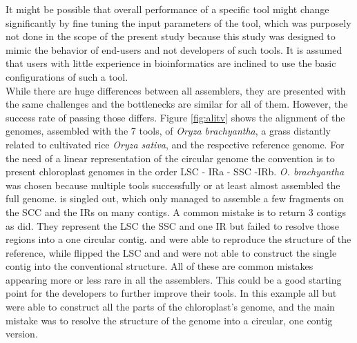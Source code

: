 It might be possible that overall performance of a specific tool might change significantly by fine tuning the
input parameters of the tool, which was purposely not done in the scope of the present study because this
study was designed to mimic the behavior of end-users and not developers of such tools. It is assumed that
users with little experience in bioinformatics are inclined to use the basic configurations of such a tool. \\

While there are huge differences between all assemblers, they are presented with the same challenges and the
bottlenecks are similar for all of them. However, the success rate of passing those differs. Figure
\ref{fig:alitv} shows the alignment of the genomes, assembled with the 7 tools, of \textit{Oryza brachyantha},
a grass distantly related to cultivated rice \textit{Oryza sativa}, and the respective reference genome. For
the need of a linear representation of the circular genome the convention is to present chloroplast genomes in
the order LSC - IRa - SSC -IRb. \textit{O. brachyantha} was chosen because multiple tools successfully or at
least almost assembled the full genome.  \cassp \hspace{.5ex} is singled out, which only managed to assemble a
few fragments on the SCC and the IRs on many contigs. A common mistake is to return 3 contigs as \ioga
\hspace{.5ex} did. They represent the LSC the SSC and one IR but failed to resolve those regions into a one
circular contig. \go \hspace{.5ex} and \fp \hspace{.5ex} were able to reproduce the structure of the
reference, while \ce \hspace{.5ex} flipped the LSC and \np \hspace{.5ex} and \oa \hspace{.5ex} were not able
to construct the single contig into the conventional structure. All of these are common mistakes appearing
more or less rare in all the assemblers. This could be a good starting point for the developers to further
improve their tools. In this example all but \cassp \hspace{.5ex} were able to construct all the parts of the
chloroplast's genome, and the main mistake was to resolve the structure of the genome into a circular, one
contig version.

